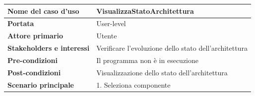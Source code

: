 \documentclass[11pt]{article}
\begin{document}
\begin{table}[h]
\begin{tabular}{|l|l|}
\hline
\textbf{Nome del caso d'uso}      & VisualizzaStatoArchitettura                                                                                                                                                                                                                                                                             \\ \hline
\textbf{Portata}                  & User-level                                                                                                                                                                                                                                                                                              \\ \hline
\textbf{Attore primario}          & Utente                                                                                                                                                                                                                                                                                                  \\ \hline
\textbf{Stakeholders e interessi} & Verificare l'evoluzione dello stato dell'architettura                                                                                                                                                                                                                                                   \\ \hline
\textbf{Pre-condizioni}           & Il programma non è in esecuzione                                                                                                                                                                                                                                                                        \\ \hline
\textbf{Post-condizioni}          & Visualizzazione dello stato dell'architettura                                                                                                                                                                                                                                                           \\ \hline
\textbf{Scenario principale}      & 1. Seleziona componente                                                                                                                                                                                                                                                                                 \\ \hline

\end{tabular}
\end{table}
\end{document}
